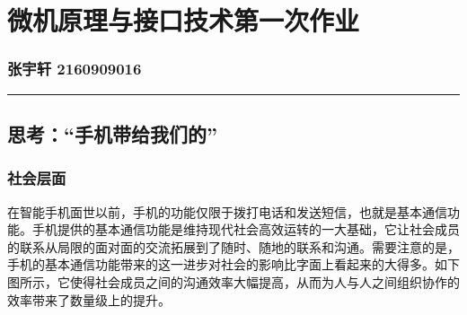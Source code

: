 \section*{微机原理与接口技术第一次作业}
    \setcounter{section}{1}
    \vspace{-5pt}\subsubsection*{张宇轩 2160909016}
    \vspace{-10pt}\noindent\rule{\textwidth}{0.1pt}
    \vspace{-30pt}
    \subsection{思考：“手机带给我们的”}
        \subsubsection*{社会层面}
            在智能手机面世以前，手机的功能仅限于拨打电话和发送短信，也就是基本通信功能。手机提供的基本通信功能是维持现代社会高效运转的一大基础，它让社会成员的联系从局限的面对面的交流拓展到了随时、随地的联系和沟通。需要注意的是，手机的基本通信功能带来的这一进步对社会的影响比字面上看起来的大得多。如下图所示，它使得社会成员之间的沟通效率大幅提高，从而为人与人之间组织协作的效率带来了数量级上的提升。
            \vspace{20pt}
